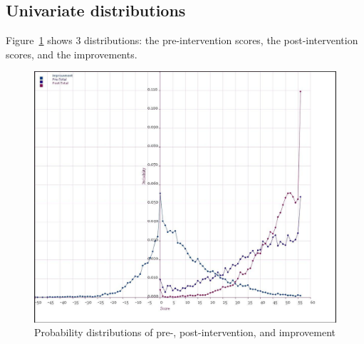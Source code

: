 \documentclass[10pt]{article}
\begin{document}
\subsection{Univariate distributions}
Figure~\ref{ShapeOfData} shows 3 distributions: the pre-intervention scores, the post-intervention scores, and the improvements.\\
\begin{figure}
\caption{Probability distributions of pre-, post-intervention, and improvement}
\label{ShapeOfData}
\begin{center}
	\includegraphics[width=160mm]{ReportMedia/ShapeOfData.jpg}
\end{center}
\end{figure}
\end{document}
